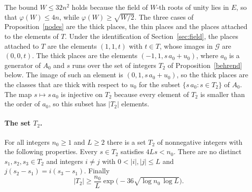 The bound $W\le32n^2$ holds because the field of $W$-th roots of unity lies in $E$, so that $\varphi(W)\le4n$, while $\varphi(W)\ge\sqrt{W/2}$. The three cases of Proposition~\ref{nodes} are the thick places, the thin places and the places attached to the elements of $T$. Under the identification of Section~\ref{sec:field}, the places attached to $T$ are the elements $(1,1,t)$ with $t\in T$, whose images in $\mathcal G$ are $(0,0,t)$. The thick places are the elements $(-1,1,s\,a_0+u_0)$, where $a_0$ is a generator of $A_0$ and $s$ runs over the set of integers $T_2$ of Proposition~\ref{behrend} below. The image of such an element is $(0,1,s\,a_0+u_0)$, so the thick places are the classes that are thick with respect to $u_0$ for the subset $\{s\,a_0:s\in T_2\}$ of $A_0$. The map $s\mapsto s\,a_0$ is injective on $T_2$ because every element of $T_2$ is smaller than the order of $a_0$, so this subset has $\lvert T_2\rvert$ elements.

\paragraph{The set $T_2$.}

\begin{proposition}\label{behrend}
For all integers $n_0\ge1$ and $L\ge2$ there is a set $T_2$ of nonnegative integers with the following properties. Every $s\in T_2$ satisfies $4Ls<n_0$. There are no distinct $s_1,s_2,s_3\in T_2$ and integers $i\ne j$ with $0<\lvert i\rvert,\lvert j\rvert\le L$ and $j(s_2-s_1)=i(s_3-s_1)$. Finally
\[
\lvert T_2\rvert\ge\frac{n_0}L\exp\Big(-36\sqrt{\log n_0\,\log L}\Big).
\]
\end{proposition}

